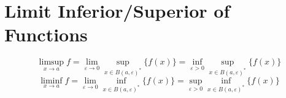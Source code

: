 \section{Limit Inferior/Superior of Functions}
\begin{definition}[metric]
\[ \limsup_{x \to a} f = \lim_{\varepsilon \to 0} \sup_{x \in B(a,\varepsilon)^\ast} \{ f(x) \} = \inf_{\varepsilon > 0} \sup_{x \in B(a,\varepsilon)^\ast} \{ f(x) \} \]
\[ \liminf_{x \to a} f = \lim_{\varepsilon \to 0} \inf_{x \in B(a,\varepsilon)^\ast} \{ f(x) \} = \sup_{\varepsilon > 0} \inf_{x \in B(a,\varepsilon)^\ast} \{ f(x) \} \]
\end{definition}
